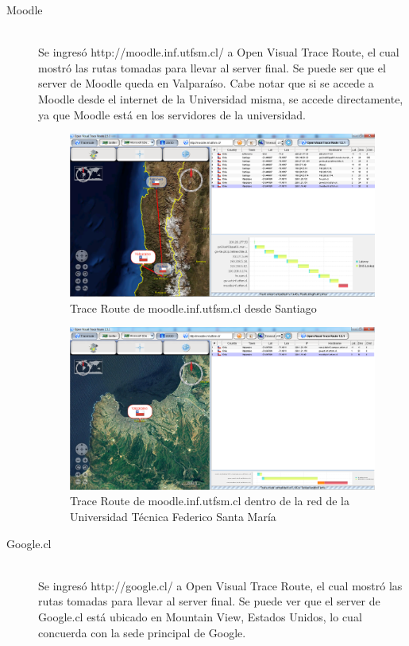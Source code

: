 \documentclass{article}
\begin{document}
\begin{description}
\item[Moodle] \hfill \\
Se ingresó http://moodle.inf.utfsm.cl/ a Open Visual Trace Route, el cual mostró las rutas tomadas para llevar al server final. Se puede ser que el server de Moodle queda en Valparaíso. Cabe notar que si se accede a Moodle desde el internet de la Universidad misma, se accede directamente, ya que Moodle está en los servidores de la universidad.

\begin{figure}[H]
\centering
\includegraphics[width=\textwidth]{tracerouteMoodle.png}
\caption{Trace Route de moodle.inf.utfsm.cl desde Santiago}
\label{fig:moodle}
\end{figure}  

\begin{figure}[H]
\centering
\includegraphics[width=\textwidth]{tracerouteMoodleValpo.png}
\caption{Trace Route de moodle.inf.utfsm.cl dentro de la red de la Universidad Técnica Federico Santa María}
\label{fig:moodle valparaiso}
\end{figure}  

\item[Google.cl] \hfill \\
Se ingresó http://google.cl/ a Open Visual Trace Route, el cual mostró las rutas tomadas para llevar al server final. Se puede ver que el server de Google.cl está ubicado en Mountain View, Estados Unidos, lo cual concuerda con la sede principal de Google\citep{website:google}.


\end{description}
\end{document}
